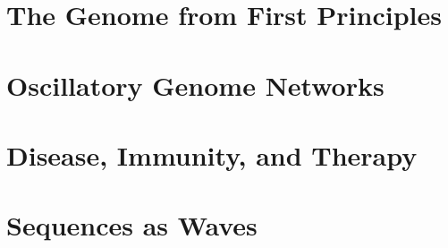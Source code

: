 \documentclass[12pt, openright, twoside, a4paper]{book}
\begin{document}
\part{The Genome from First Principles}
\label{part:genome}






\part{Oscillatory Genome Networks}
\label{part:oscillatory}






\part{Disease, Immunity, and Therapy}
\label{part:disease}






\part{Sequences as Waves}
\label{part:sequences}





\backmatter

\appendix







\printindex
\end{document}
